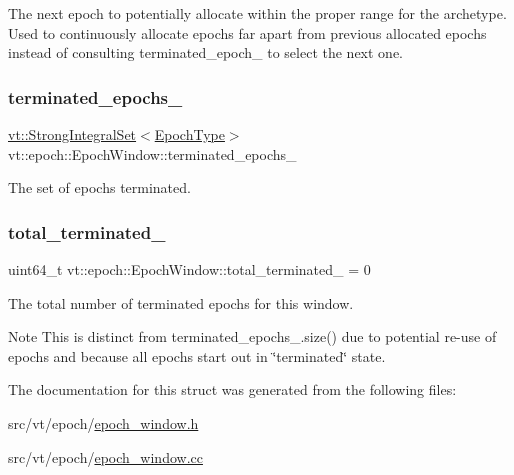 The next epoch to potentially allocate within the proper range for the archetype. Used to continuously allocate epochs far apart from previous allocated epochs instead of consulting {\ttfamily terminated\+\_\+epoch\+\_\+} to select the next one. \mbox{\label{structvt_1_1epoch_1_1_epoch_window_aa4facaab20709fbf16c061bd89b6a4e9}} 
\subsubsection{\texorpdfstring{terminated\+\_\+epochs\+\_\+}{terminated\_epochs\_}}
{\footnotesize\ttfamily \hyperlink{namespacevt_aaefb2bd6d08c8dc0ff26ed43636611b1}{vt\+::\+Strong\+Integral\+Set}$<$\hyperlink{structvt_1_1epoch_1_1_epoch_type}{Epoch\+Type}$>$ vt\+::epoch\+::\+Epoch\+Window\+::terminated\+\_\+epochs\+\_\+\hspace{0.3cm}{\ttfamily [private]}}



The set of epochs terminated. 

\mbox{\label{structvt_1_1epoch_1_1_epoch_window_a2c33b5bc9f0228eccd15b3788c4b1022}} 
\subsubsection{\texorpdfstring{total\+\_\+terminated\+\_\+}{total\_terminated\_}}
{\footnotesize\ttfamily uint64\+\_\+t vt\+::epoch\+::\+Epoch\+Window\+::total\+\_\+terminated\+\_\+ = 0\hspace{0.3cm}{\ttfamily [private]}}

The total number of terminated epochs for this window.

\begin{DoxyNote}{Note}
This is distinct from terminated\+\_\+epochs\+\_\+.\+size() due to potential re-\/use of epochs and because all epochs start out in \char`\"{}terminated\char`\"{} state. 
\end{DoxyNote}


The documentation for this struct was generated from the following files\+:\begin{DoxyCompactItemize}
\item 
src/vt/epoch/\hyperlink{epoch__window_8h}{epoch\+\_\+window.\+h}\item 
src/vt/epoch/\hyperlink{epoch__window_8cc}{epoch\+\_\+window.\+cc}\end{DoxyCompactItemize}
